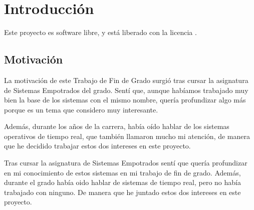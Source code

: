 \chapter{Introducción}

Este proyecto es software libre, y está liberado con la licencia \cite{gplv3}.

\section{Motivación}

La motivación de este Trabajo de Fin de Grado surgió tras cursar la asignatura de Sistemas Empotrados del grado. Sentí que, aunque habíamos trabajado muy bien la base de los sistemas con el mismo nombre, quería profundizar algo más porque es un tema que considero muy interesante. 

Además, durante los años de la carrera, había oído hablar de los sistemas operativos de tiempo real, que también llamaron mucho mi atención, de manera que he decidido trabajar estos dos intereses en este proyecto.  



Tras cursar la asignatura de Sistemas Empotrados sentí que quería profundizar en mi conocimiento de estos sistemas en mi trabajo de fin de grado. Además, durante el grado había oido hablar de sistemas de tiempo real, pero no había trabajado con ninguno. De manera que he juntado estos dos intereses en este proyecto.


